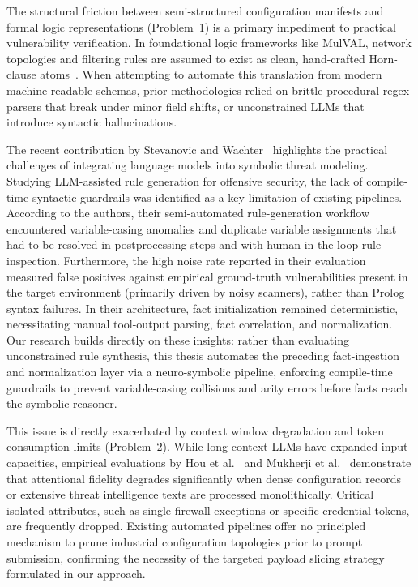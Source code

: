 \documentclass[target=mst,aauheader=aics,style=]{thud}
\begin{document}
The structural friction between semi-structured configuration manifests and formal logic representations (Problem~1) is a primary impediment to practical vulnerability verification. In foundational logic frameworks like MulVAL, network topologies and filtering rules are assumed to exist as clean, hand-crafted Horn-clause atoms~\cite{Ou05}. When attempting to automate this translation from modern machine-readable schemas, prior methodologies relied on brittle procedural regex parsers that break under minor field shifts, or unconstrained LLMs that introduce syntactic hallucinations. 

The recent contribution by Stevanovic and Wachter~\cite{StevanovicWachterRAISE} highlights the practical challenges of integrating language models into symbolic threat modeling. Studying LLM-assisted rule generation for offensive security, the lack of compile-time syntactic guardrails was identified as a key limitation of existing pipelines. According to the authors, their semi-automated rule-generation workflow encountered variable-casing anomalies and duplicate variable assignments that had to be resolved in postprocessing steps and with human-in-the-loop rule inspection. Furthermore, the high noise rate reported in their evaluation measured false positives against empirical ground-truth vulnerabilities present in the target environment (primarily driven by noisy scanners), rather than Prolog syntax failures. In their architecture, fact initialization remained deterministic, necessitating manual tool-output parsing, fact correlation, and normalization. Our research builds directly on these insights: rather than evaluating unconstrained rule synthesis, this thesis automates the preceding fact-ingestion and normalization layer via a neuro-symbolic pipeline, enforcing compile-time guardrails to prevent variable-casing collisions and arity errors before facts reach the symbolic reasoner.

This issue is directly exacerbated by context window degradation and token consumption limits (Problem~2). While long-context LLMs have expanded input capacities, empirical evaluations by Hou et al.~\cite{HouCTI} and Mukherji et al.~\cite{MukherjiEntailLLM} demonstrate that attentional fidelity degrades significantly when dense configuration records or extensive threat intelligence texts are processed monolithically. Critical isolated attributes, such as single firewall exceptions or specific credential tokens, are frequently dropped. Existing automated pipelines offer no principled mechanism to prune industrial configuration topologies prior to prompt submission, confirming the necessity of the targeted payload slicing strategy formulated in our approach.
\end{document}

